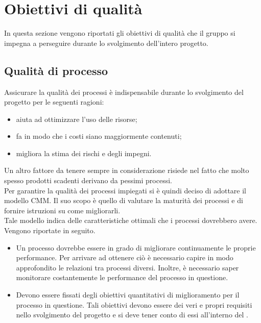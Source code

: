
\section{Obiettivi di qualità}
	In questa sezione vengono riportati gli obiettivi di qualità che il gruppo \groupname{} si impegna a perseguire durante lo svolgimento dell'intero 
	progetto.
	\subsection{Qualità di processo}
		Assicurare la qualità dei processi è indispensabile durante lo svolgimento del progetto per le seguenti ragioni:
		\begin{itemize}
			\item aiuta ad ottimizzare l'uso delle risorse;
			\item fa in modo che i costi siano maggiormente contenuti;
			\item migliora la stima dei rischi e degli impegni.
		\end{itemize}
		Un altro fattore da tenere sempre in considerazione risiede nel fatto che molto spesso prodotti scadenti derivano da pessimi processi.\\
		Per garantire la qualità dei processi impiegati si è quindi deciso di adottare il modello CMM. Il suo scopo è quello di valutare la maturità dei processi e di fornire istruzioni su come migliorarli.\\
		Tale modello indica delle caratteristiche ottimali che i processi dovrebbero avere. Vengono riportate in seguito.
		\begin{itemize}
			\item Un processo dovrebbe essere in grado di migliorare continuamente le proprie performance. Per arrivare ad ottenere ciò è necessario capire in modo approfondito le relazioni tra processi diversi. Inoltre, è necessario saper monitorare costantemente le performance del processo in questione.
			\item Devono essere fissati degli obiettivi quantitativi di miglioramento per il processo in questione. Tali obiettivi devono essere dei veri e propri requisiti nello svolgimento del progetto e si deve tener conto di essi all'interno del .
		\end{itemize}

